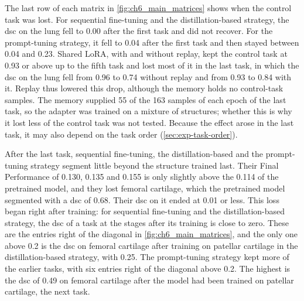 The last row of each matrix in \cref{fig:ch6_main_matrices} shows when the control task was lost.
For sequential fine-tuning and the distillation-based strategy, the \gls{dsc} on the lung fell to 0.00 after the first task and did not recover.
For the prompt-tuning strategy, it fell to 0.04 after the first task and then stayed between 0.04 and 0.23.
Shared LoRA, with and without replay, kept the control task at 0.93 or above up to the fifth task and lost most of it in the last task, in which the \gls{dsc} on the lung fell from 0.96 to 0.74 without replay and from 0.93 to 0.84 with it.
Replay thus lowered this drop, although the memory holds no control-task samples.
The memory supplied 55 of the 163 samples of each epoch of the last task, so the adapter was trained on a mixture of structures; whether this is why it lost less of the control task was not tested.
Because the effect arose in the last task, it may also depend on the task order (\cref{sec:exp-task-order}).

After the last task, sequential fine-tuning, the distillation-based and the prompt-tuning strategy segment little beyond the structure trained last.
Their Final Performance of 0.130, 0.135 and 0.155 is only slightly above the 0.114 of the pretrained model, and they lost femoral cartilage, which the pretrained model segmented with a \gls{dsc} of 0.68.
Their \gls{dsc} on it ended at 0.01 or less.
This loss began right after training: for sequential fine-tuning and the distillation-based strategy, the \gls{dsc} of a task at the stages after its training is close to zero.
These are the entries right of the diagonal in \cref{fig:ch6_main_matrices}, and the only one above 0.2 is the \gls{dsc} on femoral cartilage after training on patellar cartilage in the distillation-based strategy, with 0.25.
The prompt-tuning strategy kept more of the earlier tasks, with six entries right of the diagonal above 0.2.
The highest is the \gls{dsc} of 0.49 on femoral cartilage after the model had been trained on patellar cartilage, the next task.

